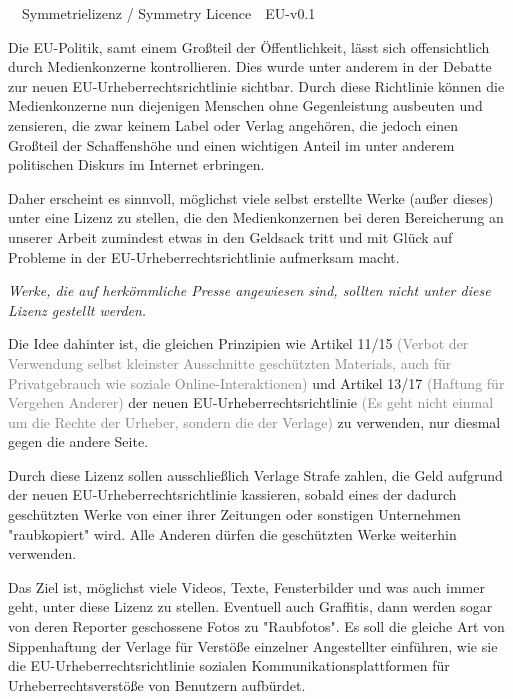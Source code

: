 \documentclass[a4paper,8pt]{extarticle}
\author{}
\date{}
\begin{document}
 
\frenchspacing
\fontsize{8.1pt}{9pt}\selectfont


\begingroup
  \centering
  \LARGE {}\ \ Symmetrielizenz / Symmetry Licence\ \ EU-v0.1\\[3em]
\endgroup


Die EU-Politik, samt einem Großteil der Öffentlichkeit, lässt sich offensichtlich durch Medienkonzerne kontrollieren. Dies wurde unter anderem in der Debatte zur neuen EU-Urheberrechtsrichtlinie sichtbar. Durch diese Richtlinie können die Medienkonzerne nun diejenigen Menschen ohne Gegenleistung ausbeuten und zensieren, die zwar keinem Label oder Verlag angehören, die jedoch einen Großteil der Schaffenshöhe und einen wichtigen Anteil im unter anderem politischen Diskurs im Internet erbringen.

Daher erscheint es sinnvoll, möglichst viele selbst erstellte Werke (außer dieses) unter eine Lizenz zu stellen, die den Medienkonzernen bei deren Bereicherung an unserer Arbeit zumindest etwas in den Geldsack tritt und mit Glück auf Probleme in der EU-Urheberrechtsrichtlinie aufmerksam macht.

\emph{Werke, die auf herkömmliche Presse angewiesen sind, sollten nicht unter diese Lizenz gestellt werden.}

Die Idee dahinter ist, die gleichen Prinzipien wie Artikel 11/15 \textcolor{gray}{(Verbot der Verwendung selbst kleinster Ausschnitte geschützten Materials, auch für Privatgebrauch wie soziale Online-Interaktionen)} und Artikel 13/17 \textcolor{gray}{(Haftung für Vergehen Anderer)} der neuen EU-Urheber\-rechts\-richt\-linie \textcolor{gray}{(Es geht nicht einmal um die Rechte der Urheber, sondern die der Verlage)} zu verwenden, nur diesmal gegen die andere Seite.

Durch diese Lizenz sollen ausschließlich Verlage Strafe zahlen, die Geld aufgrund der neuen EU-Urheber\-rechts\-richt\-linie kassieren, sobald eines der dadurch geschützten Werke von einer ihrer Zeitungen oder sonstigen Unternehmen "raubkopiert" wird. Alle Anderen dürfen die geschützten Werke weiterhin verwenden.

Das Ziel ist, möglichst viele Videos, Texte, Fensterbilder und was auch immer geht, unter diese Lizenz zu stellen. Eventuell auch Graffitis, dann werden sogar von deren Reporter geschossene Fotos zu "Raubfotos". Es soll die gleiche Art von Sippenhaftung der Verlage für Verstöße einzelner Angestellter einführen, wie sie die EU-Urheberrechtsrichtlinie sozialen Kommunikationsplattformen für Urheberrechtsverstöße von Benutzern aufbürdet.
\end{document}
